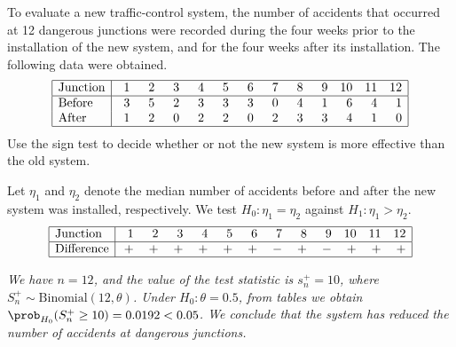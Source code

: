 \begin{example}
To evaluate a new traffic-control system, the number of accidents that occurred at 12 dangerous junctions were recorded during the four weeks prior to the installation of the new system, and for the four weeks after its installation. The following data were obtained.
\small
\[\begin{array}{|l|rrrrrrrrrrrr|} \hline
\text{Junction}	& \phantom{1}1 & \phantom{1}2 & \phantom{1}3 & \phantom{1}4 & \phantom{1}5 & \phantom{1}6 & \phantom{1}7 & \phantom{1}8 & \phantom{1}9 & 10 & 11 & 12 \\ \hline
\text{Before}	& 3 & 5 & 2 & 3 & 3 & 3 & 0 & 4 & 1 &  6 &  4 &  1 \\
\text{After}		& 1 & 2 & 0 & 2 & 2 & 0 & 2 & 3 & 3 &  4 &  1 &  0 \\ \hline
\end{array}\]
\normalsize
Use the sign test to decide whether or not the new system is more effective than the old system.
\end{example}

\begin{solution}
Let $\eta_1$ and $\eta_2$ denote the median number of accidents before and after the new system was installed, respectively. We test $H_0:\eta_1=\eta_2$ against $H_1:\eta_1 > \eta_2$.
\[\begin{array}{|l|rrrrrrrrrrrr|} \hline
\text{Junction}	& \phantom{1}1 & \phantom{1}2 & \phantom{1}3 & \phantom{1}4 & \phantom{1}5 & \phantom{1}6 & \phantom{1}7 & \phantom{1}8 & \phantom{1}9 & 10 & 11 & 12 \\ \hline
\text{Difference}	& + & + & + & + & + & + & - & + & - &  + &  + &  + \\ \hline
\end{array}\]

\bit
\it We have $n=12$, and the value of the test statistic is $s^{+}_n = 10$, where $S^{+}_n\sim\text{Binomial}(12,\theta)$.
\it Under $H_0:\theta=0.5$, from tables we obtain $\prob_{H_0}(S^{+}_n\geq 10) = 0.0192 < 0.05$.
\it We conclude that the system has reduced the number of accidents at dangerous junctions.
\eit
\end{solution}

